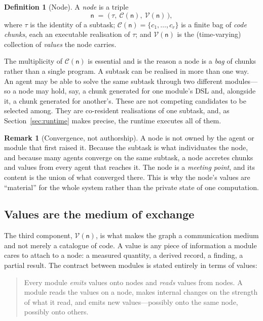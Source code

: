\documentclass[11pt,a4paper,twocolumn]{article}
\theoremstyle{definition}
\newtheorem{definition}[theorem]{Definition}
\newtheorem{remark}[theorem]{Remark}
\newcommand{\node}{\mathsf{n}}
\newcommand{\Chunks}{\mathcal{C}}
\newcommand{\Vals}{\mathcal{V}}
\begin{document}
\begin{definition}[Node]
\label{def:node}
A \emph{node} is a triple
\[
\node \;=\; \bigl(\,\tau,\ \Chunks(\node),\ \Vals(\node)\,\bigr),
\]
where $\tau$ is the identity of a subtask; $\Chunks(\node) = \{c_1, \dots,
c_r\}$ is a finite bag of \emph{code chunks}, each an executable realisation of
$\tau$; and $\Vals(\node)$ is the (time-varying) collection of \emph{values}
the node carries.
\end{definition}

The multiplicity of $\Chunks(\node)$ is essential and is the reason a node is a
\emph{bag} of chunks rather than a single program. A subtask can be realised in
more than one way. An agent may be able to solve the same subtask through two
different modules---so a node may hold, say, a chunk generated for one
module's DSL and, alongside it, a chunk generated for another's. These are not
competing candidates to be selected among. They are co-resident realisations of
one subtask, and, as Section~\ref{sec:runtime} makes precise, the runtime
executes all of them.

\begin{remark}[Convergence, not authorship]
A node is not owned by the agent or module that first raised it. Because the
subtask is what individuates the node, and because many agents converge on the
same subtask, a node accretes chunks and values from every agent that reaches
it. The node is a \emph{meeting point}, and its content is the union of what
converged there. This is why the node's values are ``material'' for the whole
system rather than the private state of one computation.
\end{remark}

\subsection{Values are the medium of exchange}

The third component, $\Vals(\node)$, is what makes the graph a communication
medium and not merely a catalogue of code. A value is any piece of information a
module cares to attach to a node: a measured quantity, a derived record, a
finding, a partial result. The contract between modules is stated entirely in
terms of values:

\begin{quote}
Every module \emph{emits} values onto nodes and \emph{reads} values from nodes.
A module reads the values on a node, makes internal changes on the strength of
what it read, and emits new values---possibly onto the same node, possibly onto
others.
\end{quote}
\end{document}
